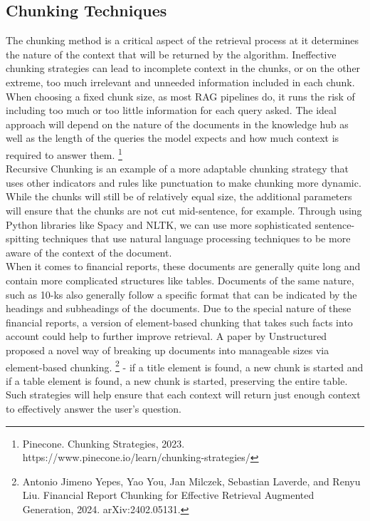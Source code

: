 \documentclass{article}
\begin{document}
    \subsection{Chunking Techniques}
    The chunking method is a critical aspect of the retrieval process at it determines the nature of the context that will be returned by the algorithm. Ineffective chunking strategies can lead to incomplete context in the chunks, or on the other extreme, too much irrelevant and unneeded information included in each chunk. When choosing a fixed chunk size, as most RAG pipelines do, it runs the risk of including too much or too little information for each query asked. The ideal approach will depend on the nature of the documents in the knowledge hub as well as the length of the queries the model expects and how much context is required to answer them. \footnote{Pinecone. Chunking Strategies, 2023. https://www.pinecone.io/learn/chunking-strategies/}
    \\ 
    
    \noindent Recursive Chunking is an example of a more adaptable chunking strategy that uses other indicators and rules like punctuation to make chunking more dynamic. While the chunks will still be of relatively equal size, the additional parameters will ensure that the chunks are not cut mid-sentence, for example. Through using Python libraries like Spacy and NLTK, we can use more sophisticated sentence-spitting techniques that use natural language processing techniques to be more aware of the context of the document. 
    \\
    
    \noindent When it comes to financial reports, these documents are generally quite long and contain more complicated structures like tables. Documents of the same nature, such as 10-ks also generally follow a specific format that can be indicated by the headings and subheadings of the documents. Due to the special nature of these financial reports, a version of element-based chunking that takes such facts into account could help to further improve retrieval. A paper by Unstructured proposed a novel way of breaking up documents into manageable sizes via element-based chunking.  \footnote{Antonio Jimeno Yepes, Yao You, Jan Milczek, Sebastian Laverde, and Renyu Liu. Financial Report Chunking for Effective Retrieval Augmented Generation, 2024. arXiv:2402.05131.} - if a title element is found, a new chunk is started and if a table element is found, a new chunk is started, preserving the entire table. Such strategies will help ensure that each context will return just enough context to effectively answer the user's question. 
    \\ 
    
\end{document}
